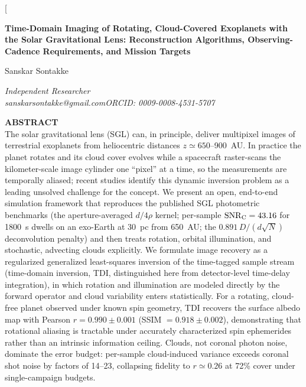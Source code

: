 \documentclass[twocolumn,10pt]{article}
\begin{document}
\twocolumn[{%
\begin{center}
{\LARGE\bfseries Time-Domain Imaging of Rotating, Cloud-Covered Exoplanets
with the Solar Gravitational Lens: Reconstruction Algorithms,
Observing-Cadence Requirements, and Mission Targets\par}
\vspace{4mm}
{\large Sanskar Sontakke\par}
\vspace{1mm}
{\small\itshape Independent Researcher\\
sanskarsontakke@gmail.com\quad ORCID: 0009-0008-4531-5707\par}
\vspace{2mm}
\vspace{4mm}
\begin{minipage}{0.86\textwidth}
\small
\textbf{ABSTRACT}\\[1mm]
The solar gravitational lens (SGL) can, in principle, deliver multipixel
images of terrestrial exoplanets from heliocentric distances
$z\simeq650$--900~AU. In practice the planet rotates and its cloud cover
evolves while a spacecraft raster-scans the kilometer-scale image cylinder
one ``pixel'' at a time, so the measurements are temporally aliased; recent
studies identify this dynamic inversion problem as a leading unsolved
challenge for the concept. We present an open, end-to-end simulation
framework that reproduces the published SGL photometric benchmarks (the
aperture-averaged $d/4\rho$ kernel; per-sample $\mathrm{SNR}_{\rm C}=43.16$
for 1800~s dwells on an exo-Earth at 30~pc from 650~AU; the
$0.891\,D/(d\sqrt{N})$ deconvolution penalty) and then treats rotation,
orbital illumination, and stochastic, advecting clouds explicitly. We
formulate image recovery as a regularized generalized least-squares
inversion of the time-tagged sample stream (time-domain inversion, TDI,
distinguished here from detector-level time-delay integration), in which
rotation and illumination are modeled directly by the forward operator and
cloud variability enters statistically. For a rotating, cloud-free planet
observed under known spin geometry, TDI recovers the surface albedo map with
Pearson $r=0.990\pm0.001$ (SSIM $=0.918\pm0.002$), demonstrating that
rotational aliasing is tractable under accurately characterized spin
ephemerides rather than an intrinsic information ceiling. Clouds, not
coronal photon noise, dominate the error budget: per-sample cloud-induced
variance exceeds coronal shot noise by factors of 14--23, collapsing
fidelity to $r\simeq0.26$ at 72\% cover under single-campaign budgets.

\end{minipage}
\end{center}}
\end{document}
